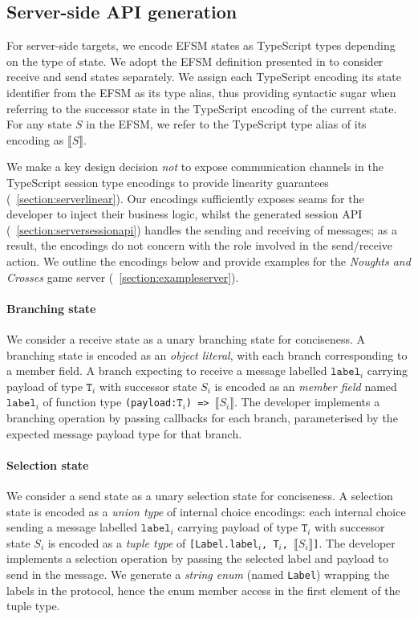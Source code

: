 \documentclass[submission,copyright,creativecommons]{eptcs}
\newcommand{\sectionref}[1]{\textsection~\ref{#1}}
\begin{document}
\subsection{Server-side API generation}
\label{section:server}
For server-side targets, we encode EFSM states as TypeScript types depending on the type of state. We adopt the EFSM definition presented in \cite{Hybrid2016} to consider receive and send states separately. We assign each TypeScript encoding its state identifier from the EFSM as its type alias, thus providing syntactic sugar when referring to the successor state in the TypeScript encoding of the current state. For any state $S$ in the EFSM, we refer to the TypeScript type alias of its encoding as $\llbracket S \rrbracket$. 

We make a key design decision \textit{not} to expose communication channels in the TypeScript session type encodings to provide linearity guarantees (\sectionref{section:serverlinear}). Our encodings sufficiently exposes seams for the developer to inject their business logic, whilst the generated session API (\sectionref{section:serversessionapi}) handles the sending and receiving of messages; as a result, the encodings do not concern with the role involved in the send/receive action. We outline the encodings below and provide examples for the \textit{Noughts and Crosses} game server (\sectionref{section:exampleserver}).

\paragraph{Branching state} We consider a receive state as a unary branching state for conciseness. A branching state is encoded as an \textit{object literal}, with each branch corresponding to a member field. A branch expecting to receive a message labelled $\texttt{label}_i$ carrying payload of type $\texttt{T}_i$ with successor state $S_i$ is encoded as an \textit{member field} named $\texttt{label}_i$ of function type \texttt{(payload:$\texttt{T}_i$) => $\llbracket S_i \rrbracket$}. The developer implements a branching operation by passing callbacks for each branch, parameterised by the expected message payload type for that branch.

\paragraph{Selection state} We consider a send state as a unary selection state for conciseness. A selection state is encoded as a \textit{union type} of internal choice encodings: each internal choice sending a message labelled $\texttt{label}_i$ carrying payload of type $\texttt{T}_i$ with successor state $S_i$ is encoded as a \textit{tuple type} of \texttt{[Label.label$_i$, T$_i$, $\llbracket S_i \rrbracket$]}. The developer implements a selection operation by passing the selected label and payload to send in the message. We generate a \textit{string enum} (named \texttt{Label}) wrapping the labels in the protocol, hence the enum member access in the first element of the tuple type.
\end{document}
